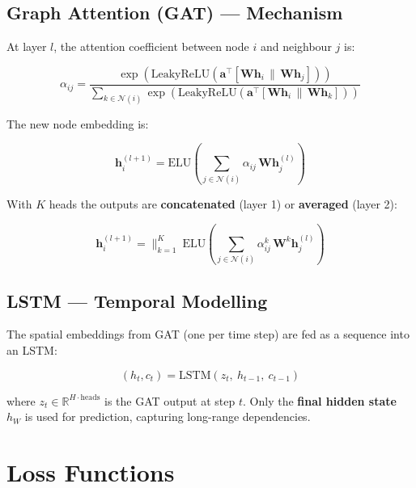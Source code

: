 \documentclass[12pt,a4paper]{article}
\begin{document}
\subsection{Graph Attention (GAT) — Mechanism}

At layer $l$, the attention coefficient between node $i$ and neighbour $j$ is:

\begin{equation}
  \alpha_{ij} = \frac{
    \exp\!\left(\text{LeakyReLU}\!\left(\mathbf{a}^\top \left[\mathbf{W}\mathbf{h}_i \,\|\, \mathbf{W}\mathbf{h}_j\right]\right)\right)
  }{
    \sum_{k \in \mathcal{N}(i)} \exp\!\left(\text{LeakyReLU}\!\left(\mathbf{a}^\top \left[\mathbf{W}\mathbf{h}_i \,\|\, \mathbf{W}\mathbf{h}_k\right]\right)\right)
  }
\end{equation}

The new node embedding is:

\begin{equation}
  \mathbf{h}^{(l+1)}_i = \text{ELU}\!\left(\sum_{j \in \mathcal{N}(i)} \alpha_{ij}\, \mathbf{W}\mathbf{h}^{(l)}_j\right)
\end{equation}

With $K$ heads the outputs are \textbf{concatenated} (layer 1) or \textbf{averaged} (layer 2):

\begin{equation}
  \mathbf{h}^{(l+1)}_i = \Big\|_{k=1}^{K}\ \text{ELU}\!\left(\sum_{j \in \mathcal{N}(i)} \alpha^k_{ij}\, \mathbf{W}^k \mathbf{h}^{(l)}_j\right)
\end{equation}

\subsection{LSTM — Temporal Modelling}

The spatial embeddings from GAT (one per time step) are fed as a sequence into an LSTM:

\begin{equation}
  (h_t, c_t) = \text{LSTM}(z_t,\ h_{t-1},\ c_{t-1})
\end{equation}

where $z_t \in \mathbb{R}^{H \cdot \text{heads}}$ is the GAT output at step $t$. Only the \textbf{final hidden state} $h_W$ is used for prediction, capturing long-range dependencies.

\section{Loss Functions}
\end{document}
